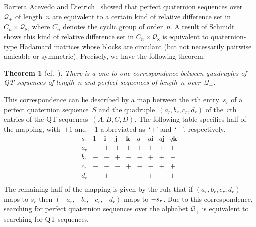 \documentclass[12pt]{article}
\numberwithin{equation}{section}
\newtheorem{theorem}{Theorem}
\newcommand{\qi}{\mathbf{i}}
\newcommand{\qj}{\mathbf{j}}
\newcommand{\qk}{\mathbf{k}}
\newcommand{\Q}{\mathcal{Q}}
\begin{document}
Barrera Acevedo and Dietrich~\cite{BAD18} showed that perfect quaternion sequences over~$\Q_+$ of length~$n$ are equivalent to
a certain kind of relative difference set in $C_n \times \Q_8$, where $C_n$ denotes the cyclic group of order~$n$.
A result of Schmidt~\cite{Schmidt1999} shows this kind of relative difference set in $C_n \times \Q_8$ is
equivalent to quaternion-type Hadamard matrices whose blocks are circulant
(but not necessarily pairwise amicable or symmetric).
Precisely, we have the following theorem.
\begin{theorem}[{cf.~\cite[Thm.~2.4]{BAD19}}]
\label{thm-bad-correspondence}
There is a one-to-one correspondence between quadruples of QT sequences of length\/~$n$ and perfect sequences of length\/~$n$ over\/~$\Q_+$.
\end{theorem}
This correspondence can be described by a map between the $r$th entry~$s_r$ of a perfect quaternion sequence~$S$ and the quadruple~$(a_r, b_r, c_r, d_r)$ of the~$r$th entries of the QT sequences~$(A,B,C,D)$. The following table specifies half of the mapping, with~$+1$ and~$-1$ abbreviated as~`$+$' and~`$-$', respectively.
\[
\begin{array}{ccccccccc} 
s_r & 1 & \qi & \qj & \qk & q & q\qi & q\qj & q\qk \\ 
\hline
a_r & - & + & + & + & + & + & + & + \\ 
b_r & - & - & + & - & - & + & + & - \\
c_r & - & - & - & + & - & - & + & + \\
d_r & - & + & - & - & - & + & - & + \\ 
\end{array}
\]
The remaining half of the mapping is given by the rule that if $(a_r, b_r, c_r, d_r)$ maps to $s_r$ then $(-a_r, -b_r, -c_r, -d_r)$ maps to $-s_r\mspace{0.7mu}$.
Due to this correspondence, searching for perfect quaternion sequences over the alphabet $\Q_+$ is equivalent to searching for QT sequences.
\end{document}
